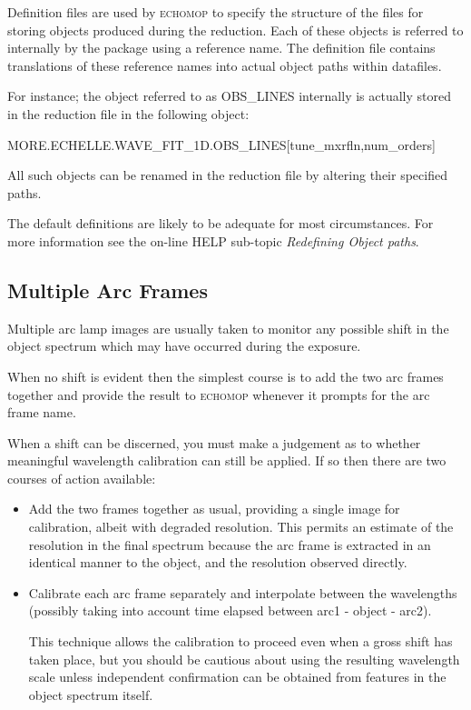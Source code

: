 \documentclass[twoside,11pt,nolof]{starlink}
\newcommand{\mlabel}[1]{\xlabel{#1}\label{#1}}
\newcommand{\myindex}[1]{\index{#1}}
\begin{document}
Definition files are used by \textsc{echomop} to specify the structure of the
files for storing objects produced during the reduction.
Each of these objects is referred to internally by the package using a
reference name.  The definition file contains translations of these
reference names into actual object paths within datafiles.

For instance; the object referred to as OBS\_LINES internally is
actually stored in the reduction file in the following object:

\begin{terminalv}
MORE.ECHELLE.WAVE_FIT_1D.OBS_LINES[tune_mxrfln,num_orders]
\end{terminalv}

All such objects can be renamed in the reduction file by altering their
specified paths.

The default definitions are likely to be adequate for most
circumstances.  For more information see the on-line HELP sub-topic
{\sl Redefining Object paths}.

\subsection{\mlabel{multi_arc_frames}Multiple Arc Frames}
\myindex{Arc frames!multiple}

Multiple arc lamp images are usually taken to monitor any possible shift
in the object spectrum which may have occurred during the exposure.

When no shift is evident then the simplest course is to add the two arc
frames together and provide the result to \textsc{echomop} whenever it
prompts for the arc frame name.

When a shift can be discerned, you must make a judgement as to
whether meaningful wavelength calibration can still be applied. If so
then there are two courses of action available:

\begin{itemize}

\item Add the two frames together as usual, providing a single image for
calibration, albeit with degraded resolution. This permits an  estimate
of the resolution in the final spectrum because the arc frame is
extracted in an identical manner to the object,  and the resolution
observed directly.

\item Calibrate each arc frame separately and interpolate between the
wavelengths (possibly taking into account time elapsed between arc1 -
object - arc2).

This technique allows the calibration to proceed even when a gross shift
has taken place, but you should be cautious about using the resulting
wavelength scale unless independent confirmation can be obtained from
features in the object spectrum itself.

\end{itemize}
\end{document}
